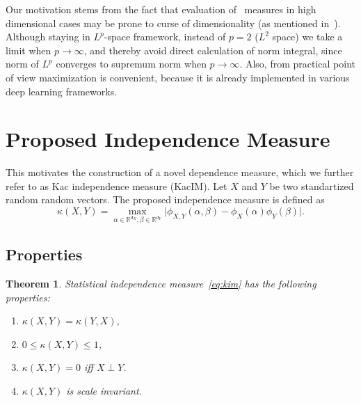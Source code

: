 \documentclass{article}
\newtheorem{theorem}{Theorem}
\begin{document}
Our motivation stems from the fact that evaluation of~\cite{Szekely} measures in high dimensional cases may be prone to curse of dimensionality (as mentioned in~\cite{Edlemann}). Although staying in $L^{p}$-space framework, instead of $p = 2$ ($L^{2}$ space) we take a limit when  $p \rightarrow \infty$, and thereby avoid direct calculation of norm integral, since norm of $L^{p}$ converges to supremum norm when $p \rightarrow \infty$. Also, from practical point of view maximization is convenient, because it is already implemented in various deep learning frameworks. %

\section{Proposed Independence Measure}
\label{section:proposed_method}



\noindent This motivates the construction of a novel dependence measure, which we further refer to as Kac independence measure (KacIM). Let $X$ and $Y$ be two standartized random random vectors. The proposed independence measure is defined as
\begin{equation}
\label{eq:kim}
    \kappa(X,Y) = \max_{\alpha \in \mathbb{R}^{d_{X}}, \beta \in \mathbb{R}^{d_{Y}}} \vert \phi_{X,Y}(\alpha, \beta)  -\phi_{X}(\alpha) \phi_{Y}(\beta) \vert.
\end{equation}


\subsection{Properties}
\begin{theorem}
\label{thm:properties}
  Statistical independence measure~\eqref{eq:kim} has the following properties:
  \begin{enumerate} 
    \item $\kappa(X,Y) = \kappa(Y,X)$,
    \item $0 \leq \kappa(X,Y) \leq 1$,
    \item $\kappa(X,Y) = 0$ iff $X\perp Y$.
    \item $\kappa(X,Y)$ is scale invariant.
   \end{enumerate}    
\end{theorem}
\end{document}
